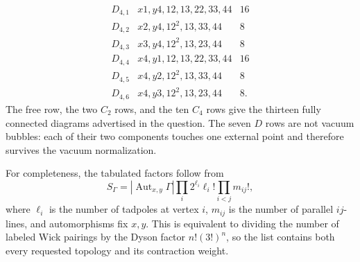 \begin{enumerate}
\begin{enumerate}
\begin{center}
\end{center}
\[
\begin{array}{c|l|c}
D_{4,1}&x1,y4,12,13,22,33,44&16\\
D_{4,2}&x2,y4,12^2,13,33,44&8\\
D_{4,3}&x3,y4,12^2,13,23,44&8\\
D_{4,4}&x4,y1,12,13,22,33,44&16\\
D_{4,5}&x4,y2,12^2,13,33,44&8\\
D_{4,6}&x4,y3,12^2,13,23,44&8 .
\end{array}
\]
The free row, the two \(C_2\) rows, and the ten \(C_4\) rows give the
thirteen fully connected diagrams advertised in the question.  The
seven \(D\) rows are not vacuum bubbles: each of their two components
touches one external point and therefore survives the vacuum
normalization.

For completeness, the tabulated factors follow from
\[
 S_\Gamma=
 |\operatorname{Aut}_{x,y}\Gamma|
 \prod_i2^{\ell_i}\ell_i!
 \prod_{i<j}m_{ij}!,
\]
where \(\ell_i\) is the number of tadpoles at vertex \(i\),
\(m_{ij}\) is the number of parallel \(ij\)-lines, and automorphisms fix
\(x,y\).  This is equivalent to dividing the number of labeled Wick
pairings by the Dyson factor \(n!(3!)^n\), so the list contains both
every requested topology and its contraction weight.
\end{enumerate}


\end{enumerate}
